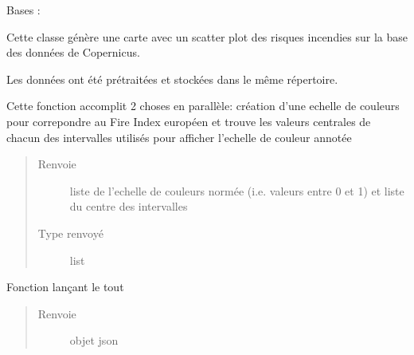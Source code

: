 \documentclass[letterpaper,10pt,french]{sphinxmanual}
\begin{document}
\begin{fulllineitems}
\label{\detokenize{app.home.content_gen:app.home.content_gen.map_generation.FirePlot}}
\sphinxAtStartPar
Bases : 

\sphinxAtStartPar
Cette classe génère une carte avec un scatter plot des risques incendies sur la base des données de Copernicus.

\sphinxAtStartPar
Les données ont été pré\sphinxhyphen{}traitées et stockées dans le même répertoire.

\begin{fulllineitems}
\label{\detokenize{app.home.content_gen:app.home.content_gen.map_generation.FirePlot.color_scale}}
\sphinxAtStartPar
Cette fonction accomplit 2 choses en parallèle: création d’une echelle de couleurs pour correpondre au Fire Index européen et
trouve les valeurs centrales de chacun des intervalles utilisés pour afficher l’echelle de couleur annotée
\begin{quote}\begin{description}
\item[{Renvoie}] \leavevmode
\sphinxAtStartPar
liste de l’echelle de couleurs normée (i.e. valeurs entre 0 et 1) et liste du centre des intervalles

\item[{Type renvoyé}] \leavevmode
\sphinxAtStartPar
list

\end{description}\end{quote}

\end{fulllineitems}


\begin{fulllineitems}
\label{\detokenize{app.home.content_gen:app.home.content_gen.map_generation.FirePlot.main}}
\sphinxAtStartPar
Fonction lançant le tout
\begin{quote}\begin{description}
\item[{Renvoie}] \leavevmode
\sphinxAtStartPar
objet json


\end{description}
\end{quote}
\end{fulllineitems}
\end{fulllineitems}
\end{document}
